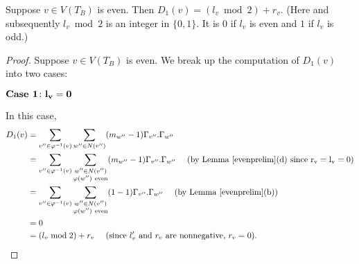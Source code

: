 \begin{lemma}\label{evensecond}
 Suppose $v \in V(T_B)$ is even. Then $ D_1(v) = (l_v \bmod 2)+r_v$. (Here and subsequently $l_v \bmod 2$ is an integer in $\{0,1\}$. It is $0$ if $l_v$ is even and $1$ if $l_v$ is odd.)
\end{lemma}
\begin{proof}
 Suppose $v \in V(T_B)$ is even. 
 We break up the computation of $D_1(v)$ into two cases:
\begin{flushleft} $\textbf{\textup{Case 1}} \colon \mathbf{l_v = 0}$ \end{flushleft}
 In this case, 
 \begin{align*} 
D_1(v) &= \sum_{v'' \in \phi^{-1}(v)}  \sum_{w'' \in N(v'')} (m_{w''} - 1) \Gamma_{v''}.\Gamma_{w''}  \\
&= \sum_{v'' \in \phi^{-1}(v)} {\sum_{\substack{w'' \in N(v'') \\ \phi(w'') \ \mathrm{even}}}} (m_{w''} - 1) \Gamma_{v''}.\Gamma_{w''}  \ \ \ \ (\mathrm{by \ Lemma~\ref{evenprelim}(d) \ since \ r_v =l_v = 0 }) \\
&= \sum_{v'' \in \phi^{-1}(v)} {\sum_{\substack{w'' \in N(v'') \\ \phi(w'') \ \mathrm{even}}}} (1 - 1) \Gamma_{v''}.\Gamma_{w''} \ \ \ \ (\mathrm{by \ Lemma~\ref{evenprelim}(b)}) \\
&=  0 \\
&= (l_v \bmod 2)+r_v\ \ \ \ (\textup{since $l'_v$ and $r_v$ are nonnegative, $r_v = 0$}) . 
\end{align*}


\end{proof}
